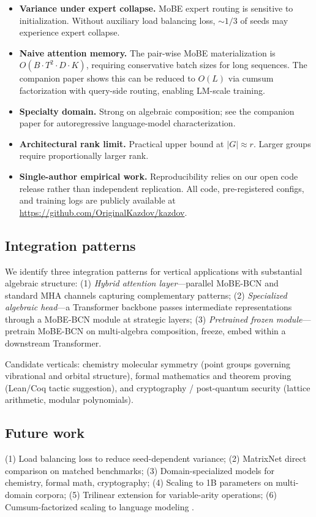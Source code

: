 \documentclass[11pt]{article}
\begin{document}
\begin{itemize}
\item \textbf{Variance under expert collapse.} MoBE expert routing
    is sensitive to initialization. Without auxiliary load balancing
    loss, $\sim 1/3$ of seeds may experience expert collapse.
\item \textbf{Naive attention memory.} The pair-wise MoBE
    materialization is $O(B \cdot T^2 \cdot D \cdot K)$, requiring
    conservative batch sizes for long sequences. The companion paper
    \citep{dovzak2026kazdov} shows this can be reduced to $O(L)$ via
    cumsum factorization with query-side routing, enabling LM-scale
    training.
\item \textbf{Specialty domain.} Strong on algebraic composition;
    see the companion paper for autoregressive language-model
    characterization.
\item \textbf{Architectural rank limit.} Practical upper bound at
    $|G| \approx r$. Larger groups require proportionally larger rank.
\item \textbf{Single-author empirical work.} Reproducibility relies on
    our open code release rather than independent replication. All
    code, pre-registered configs, and training logs are publicly
    available at \url{https://github.com/OriginalKazdov/kazdov}.
\end{itemize}

\subsection{Integration patterns}
We identify three integration patterns for vertical applications with
substantial algebraic structure:
(1) \emph{Hybrid attention layer}---parallel MoBE-BCN and standard MHA
channels capturing complementary patterns;
(2) \emph{Specialized algebraic head}---a Transformer backbone passes
intermediate representations through a MoBE-BCN module at strategic
layers;
(3) \emph{Pretrained frozen module}---pretrain MoBE-BCN on multi-algebra
composition, freeze, embed within a downstream Transformer.

Candidate verticals: chemistry molecular symmetry (point groups
governing vibrational and orbital structure), formal mathematics and
theorem proving (Lean/Coq tactic suggestion), and cryptography /
post-quantum security (lattice arithmetic, modular polynomials).

\subsection{Future work}
(1) Load balancing loss to reduce seed-dependent variance;
(2) MatrixNet direct comparison on matched benchmarks;
(3) Domain-specialized models for chemistry, formal math, cryptography;
(4) Scaling to 1B parameters on multi-domain corpora;
(5) Trilinear extension for variable-arity operations;
(6) Cumsum-factorized scaling to language modeling
\citep{dovzak2026kazdov}.
\end{document}
